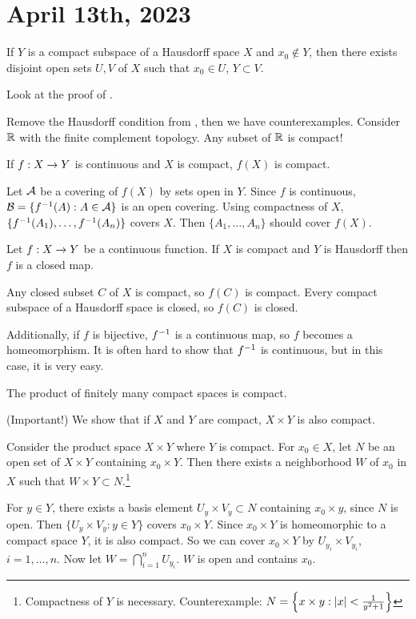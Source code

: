 \section*{April 13th, 2023}

 If \(Y\) is a compact subspace of a Hausdorff space \(X\) and \(x_0 \notin Y\), then there exists disjoint open sets \(U, V\) of \(X\) such that \(x_0 \in U\), \(Y \subset V\).

\pf Look at the proof of .

Remove the Hausdorff condition from , then we have counterexamples. Consider \(\mathbb{R}\) with the finite complement topology. Any subset of \(\mathbb{R}\) is compact!

 If \(f : X \rightarrow Y\) is continuous and \(X\) is compact, \(f(X)\) is compact.

\pf Let \(\mathcal{A}\) be a covering of \(f(X)\) by sets open in \(Y\). Since \(f\) is continuous, \(\mathcal{B} = \{f^{-1}(A) : A \in \mathcal{A}\}\) is an open covering. Using compactness of \(X\), \(\{f^{-1}(A_1), \dots, f^{-1}(A_n)\}\) covers \(X\). Then \(\{A_1, \dots, A_n\}\) should cover \(f(X)\).

 Let \(f : X \rightarrow Y\) be a continuous function. If \(X\) is compact and \(Y\) is Hausdorff then \(f\) is a closed map.

\pf Any closed subset \(C\) of \(X\) is compact, so \(f(C)\) is compact. Every compact subspace of a Hausdorff space is closed, so \(f(C)\) is closed.

\rmk Additionally, if \(f\) is bijective, \(f^{-1}\) is a continuous map, so \(f\) becomes a homeomorphism. It is often hard to show that \(f^{-1}\) is continuous, but in this case, it is very easy.

 The product of finitely many compact spaces is compact.

\pf (Important!) We show that if \(X\) and \(Y\) are compact, \(X \times Y\) is also compact.

  Consider the product space \(X \times Y\) where \(Y\) is compact. For \(x_0 \in X\), let \(N\) be an open set of \(X \times Y\) containing \(x_0 \times Y\). Then there exists a neighborhood \(W\) of \(x_0\) in \(X\) such that \(W \times Y \subset N\).\footnote{Compactness of \(Y\) is necessary. Counterexample: \(N = \left\{x\times y : \left| x \right| < \frac{1}{y^2 + 1}\right\}\)}

\pf For \(y \in Y\), there exists a basis element \(U_y \times V_y \subset N\) containing \(x_0 \times y\), since \(N\) is open. Then \(\{U_y\times V_y : y \in Y\}\) covers \(x_0 \times Y\). Since \(x_0 \times Y\) is homeomorphic to a compact space \(Y\), it is also compact. So we can cover \(x_0 \times Y\) by \(U_{y_i} \times V_{y_i}\), \(i = 1, \dots, n\). Now let \(W = \bigcap_{i=1}^n U_{y_i}\). \(W\) is open and contains \(x_0\).

